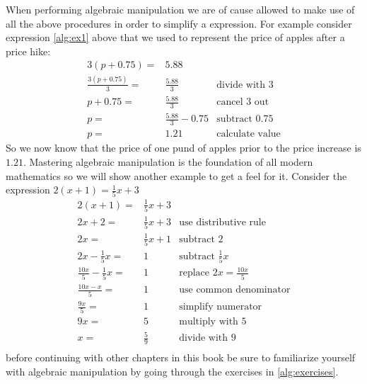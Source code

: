 When performing algebraic manipulation we are of cause allowed to make
use of all the above procedures in order to simplify a expression. For
example consider expression \ref{alg:ex1} above that we used to represent
the price of apples after a price hike:
\begin{align*}
3(p + 0.75)           =& 5.88                  &                          \\
\frac{3(p + 0.75)}{3} =& \frac{5.88}{3}        & \textrm{divide with $3$} \\
p + 0.75              =& \frac{5.88}{3}        & \textrm{cancel $3$ out}  \\
p                     =& \frac{5.88}{3} - 0.75 & \textrm{subtract $0.75$} \\
p                     =& 1.21                  & \textrm{calculate value}
\end{align*}
So we now know that the price of one pund of apples prior to the price
increase is $1.21$. Mastering algebraic manipulation is the foundation of
all modern mathematics so we will show another example to get a feel for
it. Consider the expression $2(x + 1) = \frac{1}{5}x + 3$
\begin{align*}
2(x + 1)                     =& \frac{1}{5}x + 3 &                                       \\
2x + 2                       =& \frac{1}{5}x + 3 & \textrm{use distributive rule}        \\
2x                           =& \frac{1}{5}x + 1 & \textrm{subtract $2$}                 \\
2x - \frac{1}{5}x            =& 1                & \textrm{subtract $\frac{1}{5}x$}      \\
\frac{10x}{5} - \frac{1}{5}x =& 1                & \textrm{replace $2x = \frac{10x}{5}$} \\
\frac{10x - x}{5}            =& 1                & \textrm{use common denominator}       \\
\frac{9x}{5}                 =& 1                & \textrm{simplify numerator}           \\
9x                           =& 5                & \textrm{multiply with $5$}            \\
x                            =& \frac{5}{9}      & \textrm{divide with $9$}              \\
\end{align*}
before continuing with other chapters in this book be sure to familiarize
yourself with algebraic manipulation by going through the exercises in
\ref{alg:exercises}.

